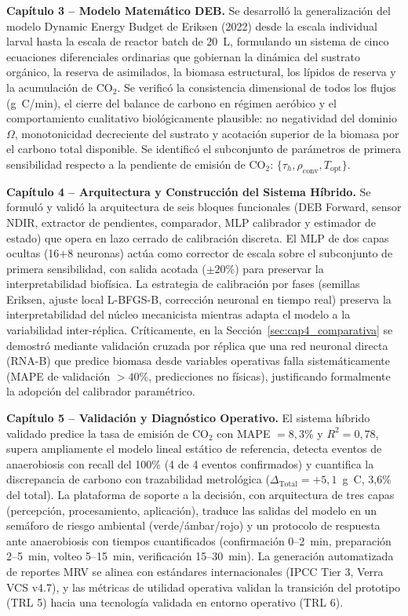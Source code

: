 \textbf{Capítulo 3 -- Modelo Matemático DEB.} Se desarrolló la generalización del modelo Dynamic Energy Budget de Eriksen (2022) desde la escala individual larval hasta la escala de reactor batch de 20~L, formulando un sistema de cinco ecuaciones diferenciales ordinarias que gobiernan la dinámica del sustrato orgánico, la reserva de asimilados, la biomasa estructural, los lípidos de reserva y la acumulación de CO$_2$. Se verificó la consistencia dimensional de todos los flujos (g~C/min), el cierre del balance de carbono en régimen aeróbico y el comportamiento cualitativo biológicamente plausible: no negatividad del dominio $\Omega$, monotonicidad decreciente del sustrato y acotación superior de la biomasa por el carbono total disponible. Se identificó el subconjunto de parámetros de primera sensibilidad respecto a la pendiente de emisión de CO$_2$: $\{\tau_h, \rho_{\mathrm{conv}}, T_{\mathrm{opt}}\}$.

\textbf{Capítulo 4 -- Arquitectura y Construcción del Sistema Híbrido.} Se formuló y validó la arquitectura de seis bloques funcionales (DEB Forward, sensor NDIR, extractor de pendientes, comparador, MLP calibrador y estimador de estado) que opera en lazo cerrado de calibración discreta. El MLP de dos capas ocultas (16+8 neuronas) actúa como corrector de escala sobre el subconjunto de primera sensibilidad, con salida acotada ($\pm 20$\%) para preservar la interpretabilidad biofísica. La estrategia de calibración por fases (semillas Eriksen, ajuste local L-BFGS-B, corrección neuronal en tiempo real) preserva la interpretabilidad del núcleo mecanicista mientras adapta el modelo a la variabilidad inter-réplica. Críticamente, en la Sección~\ref{sec:cap4_comparativa} se demostró mediante validación cruzada por réplica que una red neuronal directa (RNA-B) que predice biomasa desde variables operativas falla sistemáticamente (MAPE de validación $> 40$\%, predicciones no físicas), justificando formalmente la adopción del calibrador paramétrico.

\textbf{Capítulo 5 -- Validación y Diagnóstico Operativo.} El sistema híbrido validado predice la tasa de emisión de CO$_2$ con MAPE $= 8{,}3$\% y $R^2 = 0{,}78$, supera ampliamente el modelo lineal estático de referencia, detecta eventos de anaerobiosis con recall del 100\% (4 de 4 eventos confirmados) y cuantifica la discrepancia de carbono con trazabilidad metrológica ($\Delta_{\mathrm{Total}} = +5{,}1$~g~C, 3{,}6\% del total). La plataforma de soporte a la decisión, con arquitectura de tres capas (percepción, procesamiento, aplicación), traduce las salidas del modelo en un semáforo de riesgo ambiental (verde/ámbar/rojo) y un protocolo de respuesta ante anaerobiosis con tiempos cuantificados (confirmación 0--2~min, preparación 2--5~min, volteo 5--15~min, verificación 15--30~min). La generación automatizada de reportes MRV se alinea con estándares internacionales (IPCC Tier 3, Verra VCS v4.7), y las métricas de utilidad operativa validan la transición del prototipo (TRL 5) hacia una tecnología validada en entorno operativo (TRL 6).

